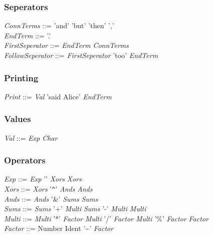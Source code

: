 \documentclass[10pt]{article}
\begin{document}
  \subsubsection{Seperators}
  \emph{ConnTerms} ::= 'and' \textbar \space 'but' \textbar \space 'then' \textbar \space ','
  \\  
  \emph{EndTerm} ::= '.'
  \\
  \emph{FirstSeperator} ::= \emph{EndTerm} \textbar \space \emph{ConnTerms}
  \\
  \emph{FollowSeperator} ::= \emph{FirstSeperator} \textbar \space 'too' \emph{EndTerm}
  \subsubsection{Printing}
  \emph{Print} ::= \emph{Val} 'said Alice' \emph{EndTerm}
  \subsubsection{Values}
  \emph{Val} ::= \emph{Exp} \textbar \space \emph{Char}
  \subsubsection{Operators}
  \emph{Exp} ::= \emph{Exp} '\textbar' \emph{Xors} \textbar \space \emph{Xors} 
  \\
  \emph{Xors} ::= \emph{Xors} '\verb|^|' \emph{Ands} \textbar \space \emph{Ands}
  \\
  \emph{Ands} ::= \emph{Ands} '\&' \emph{Sums} \textbar \space \emph{Sums}
  \\
  \emph{Sums} ::= \emph{Sums} '+' \emph{Multi} \textbar \space \emph{Sums} '-' \emph{Multi} \textbar \space \emph{Multi}
  \\
  \emph{Multi} ::= \emph{Multi} '*' \emph{Factor} \textbar \space \emph{Multi} '/' \emph{Factor} \textbar \space \emph{Multi} '\%' \emph{Factor} \textbar \space \emph{Factor}
  \\
  \emph{Factor} ::= Number  \textbar \space Ident  \textbar \space '\textasciitilde' \emph{Factor}

  
\end{document}
